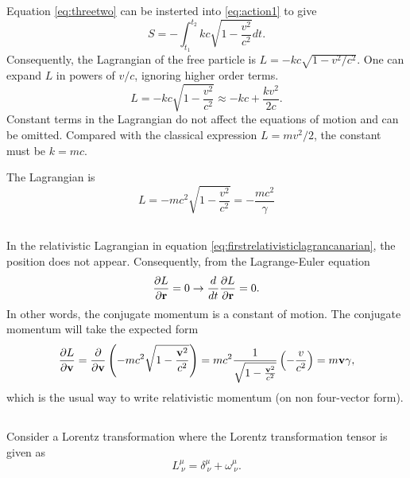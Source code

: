 \documentclass[11pt]{amsart}
\begin{document}
Equation \ref{eq:threetwo} can be insterted into \ref{eq:action1} to give
\begin{equation}
S = - \int_{t_1}^{t_2} k c\sqrt{1-\frac{v^2}{c^2}}dt.
\end{equation}
Consequently, the Lagrangian of the free particle is $L = -kc\sqrt{1-v^2/c^2}$. One can expand $L$ in powers of $v/c$, ignoring higher order terms.
\begin{equation*}
L = -kc\sqrt{1-\frac{v^2}{c^2}} \approx -kc + \frac{kv^2}{2c}.
\end{equation*}
Constant terms in the Lagrangian do not affect the equations of motion and can be omitted. Compared with the classical expression $L = mv^2/2$, the constant must be $k=mc$.

The Lagrangian is
\begin{equation}
\label{eq:firstrelativisticlagrancanarian}
L = -mc^2\sqrt{1-\frac{v^2}{c^2}} = -\frac{mc^2}{\gamma}
\end{equation}

\subsection{}
In the relativistic Lagrangian in equation \ref{eq:firstrelativisticlagrancanarian}, the position does not appear. Consequently, from the Lagrange-Euler equation
\begin{equation*}
\frac{\partial L}{\partial \vb{r}} = 0 \to \frac{d}{dt}\frac{\partial L}{\partial \vb{r}} = 0.
\end{equation*}
In other words, the conjugate momentum is a constant of motion. The conjugate momentum will take the expected form
\begin{equation}
\frac{\partial L}{\partial \vb{v}} = \frac{\partial}{\partial \vb{v}}\left(-mc^2\sqrt{1-\frac{\vb{v}^2}{c^2}} \right) = mc^2\frac{1}{\sqrt{1-\frac{\vb{v}^2}{c^2}}}\left(-\frac{v}{c^2}\right) = m\vb{v}\gamma,
\end{equation}
which is the usual way to write relativistic momentum (on non four-vector form).

\subsection{}
Consider a Lorentz transformation where the Lorentz transformation tensor is given as
\begin{equation}
\label{eq:lorentztransform}
L^\mu_{\ \nu} = \delta^{\mu}_{\ \nu} + \omega^{\mu}_{\ \nu}.
\end{equation}
\end{document}

